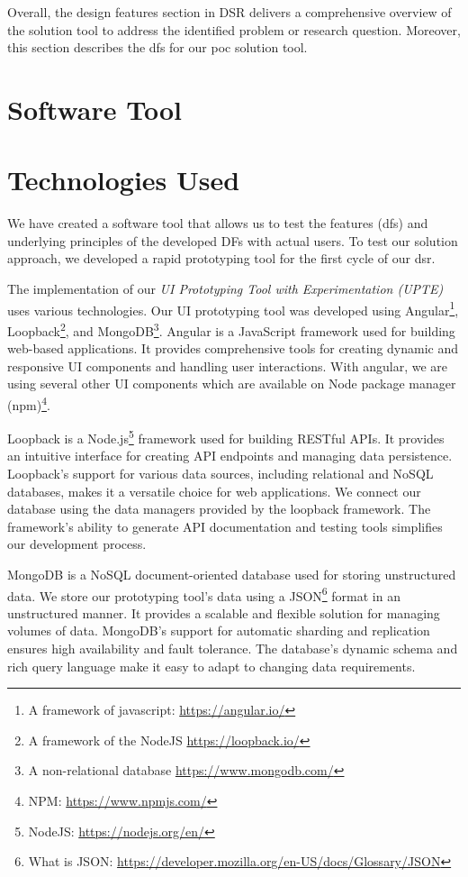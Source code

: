 Overall, the design features section in DSR delivers a comprehensive overview of the solution tool to address the identified problem or research question. 
Moreover, this section describes the \ac{df}s for our \ac{poc} solution tool.
\clearpage

\section{Software Tool}
\label{implementation:section:tool}

\clearpage
\section{Technologies Used}
\label{implementation:section:technologies}
We have created a software tool that allows us to test the features (\ac{df}s) and underlying principles of the developed DFs with actual users.
To test our solution approach, we developed a rapid prototyping tool for the first cycle of our \ac{dsr}. 

The implementation of our \textit{UI Prototyping Tool with Experimentation (UPTE)} uses various technologies.
Our UI prototyping tool was developed using Angular\footnote{A framework of javascript: \url{https://angular.io/}}, Loopback\footnote{A framework of the NodeJS \url{https://loopback.io/}}, and MongoDB\footnote{A non-relational database \url{https://www.mongodb.com/}}.
Angular is a JavaScript framework used for building web-based applications.
It provides comprehensive tools for creating dynamic and responsive UI components and handling user interactions.
With angular, we are using several other UI components which are available on Node package manager (npm)\footnote{NPM: \url{https://www.npmjs.com/}}.

Loopback is a Node.js\footnote{NodeJS: \url{https://nodejs.org/en/}} framework used for building RESTful APIs. 
It provides an intuitive interface for creating API endpoints and managing data persistence. 
Loopback's support for various data sources, including relational and NoSQL databases, makes it a versatile choice for web applications. 
We connect our database using the data managers provided by the loopback framework.
The framework's ability to generate API documentation and testing tools simplifies our development process.

MongoDB is a NoSQL document-oriented database used for storing unstructured data. 
We store our prototyping tool's data using a JSON\footnote{What is JSON: \url{https://developer.mozilla.org/en-US/docs/Glossary/JSON}} format in an unstructured manner.
It provides a scalable and flexible solution for managing volumes of data. 
MongoDB's support for automatic sharding and replication ensures high availability and fault tolerance. 
The database's dynamic schema and rich query language make it easy to adapt to changing data requirements.

